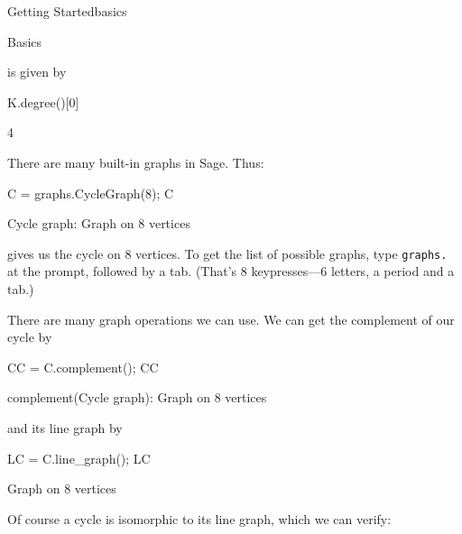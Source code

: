 \begin{chap}{Getting Started}{basics}
\begin{sect}{Basics}
\begin{para}
is given by
\end{para}
%
\begin{sagecode}
\begin{sageinput}
K.degree()[0]
\end{sageinput}
\begin{sageoutput}
4
\end{sageoutput}
\end{sagecode}
%
\begin{para}
There are many built-in graphs in Sage. Thus:
\end{para}
%
\begin{sagecode}
\begin{sageinput}
C = graphs.CycleGraph(8); C
\end{sageinput}
\begin{sageoutput}
Cycle graph: Graph on 8 vertices
\end{sageoutput}
\end{sagecode}
%
\begin{para}
gives us the cycle on 8 vertices. To get the list of possible graphs,
type \verb|graphs.| at the prompt, followed by a tab. (That's 8 keypresses---6 letters,
a period and a tab.)
\end{para}
%
\begin{para}
There are many graph operations we can use. We can get the complement of
our cycle by
\end{para}
%
\begin{sagecode}
\begin{sageinput}
CC = C.complement(); CC
\end{sageinput}
\begin{sageoutput}
complement(Cycle graph): Graph on 8 vertices
\end{sageoutput}
\end{sagecode}
%
\begin{para}
and its line graph by
\end{para}
%
\begin{sagecode}
\begin{sageinput}
LC = C.line_graph(); LC
\end{sageinput}
\begin{sageoutput}
Graph on 8 vertices
\end{sageoutput}
\end{sagecode}
%
\begin{para}
Of course a cycle is isomorphic to its line graph, which we can verify:
\end{para}
%
\begin{sagecode}

\end{sagecode}
\end{sect}
\end{chap}
